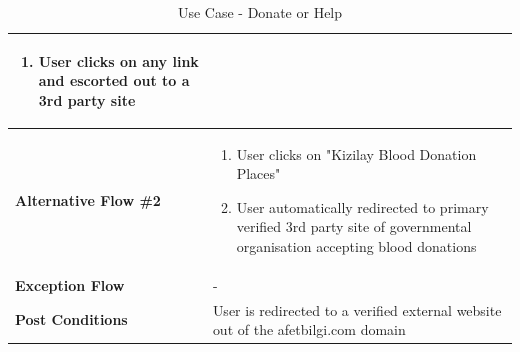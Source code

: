 \begin{table}[H]
\begin{tabular}{|p{.3\linewidth}|p{.7\linewidth}|}
\begin{minipage}[ht]{\linewidth}
\begin{enumerate}[label=\textbf{Step \arabic*:},leftmargin=1.5\leftmargin]
                \item User clicks on any link and escorted out to a 3rd party site
            \end{enumerate}
        \end{minipage} \\
    \hline
    \textbf{Alternative Flow \#2} &
    \begin{minipage}[ht]{\linewidth} 
            \begin{enumerate}[label=\textbf{Step \arabic*:},leftmargin=1.5\leftmargin]
                \item User clicks on "Kizilay Blood Donation Places"
                \item User automatically redirected to primary verified 3rd party site of governmental organisation accepting blood donations
            \end{enumerate}
        \end{minipage} \\
    \hline
    \textbf{Exception Flow} & - \\
    \hline
    \textbf{Post Conditions} & User is redirected to a verified external website out of the afetbilgi.com domain \\
    \hline
  \end{tabular}
  \caption{Use Case - Donate or Help}
\end{table}

